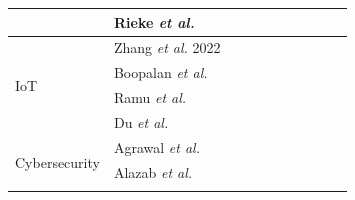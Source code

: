 \documentclass[journal]{IEEEtran}
\newcommand{\cmark}{\ding{51}}
\newcommand{\xmark}{\ding{55}}
\begin{document}
\begin{table}[t]
\begin{tabular}{|l|l|lllll|lll|}
                       &          Rieke \textit{et al.}~\cite{rieke2020future}             & \multicolumn{1}{c|}{\xmark} & \multicolumn{1}{c|}{\cmark} & \multicolumn{1}{c|}{\cmark} & \multicolumn{1}{c|}{\xmark} & \multicolumn{1}{c|}{\cmark} & \multicolumn{1}{c|}{\cmark} & \multicolumn{1}{c|}{\cmark} & \multicolumn{1}{c|}{\cmark} \\ \hline
    \multirow{4}{*}{IoT}  &   Zhang \textit{et al.} 2022~\cite{zhang2022federated}         & \multicolumn{1}{c|}{\cmark} & \multicolumn{1}{c|}{\cmark} & \multicolumn{1}{c|}{\xmark} & \multicolumn{1}{c|}{\xmark} & \multicolumn{1}{c|}{\xmark} & \multicolumn{1}{c|}{\cmark} & \multicolumn{1}{c|}{\cmark} & \multicolumn{1}{c|}{\cmark} \\ \cline{2-10} 
                       &    Boopalan \textit{et al.}~\cite{boopalan2022fusion}    & \multicolumn{1}{c|}{ \cmark } & \multicolumn{1}{c|}{\cmark} & \multicolumn{1}{c|}{\cmark} & \multicolumn{1}{c|}{\cmark} & \multicolumn{1}{c|}{\cmark}  & \multicolumn{1}{c|}{\cmark} & \multicolumn{1}{c|}{\cmark} & \multicolumn{1}{c|}{\cmark}  \\ \cline{2-10}
                       &    Ramu \textit{et al.}~\cite{ramu2022federated}    & \multicolumn{1}{c|}{ \cmark } & \multicolumn{1}{c|}{\cmark} & \multicolumn{1}{c|}{\cmark} & \multicolumn{1}{c|}{\xmark} & \multicolumn{1}{c|}{\cmark}  & \multicolumn{1}{c|}{\cmark} & \multicolumn{1}{c|}{\cmark} & \multicolumn{1}{c|}{\cmark}  \\ \cline{2-10}
                       &  Du \textit{et al.}~\cite{du2020federated} & \multicolumn{1}{c|}{\cmark} & \multicolumn{1}{c|}{\cmark} & \multicolumn{1}{c|}{\cmark} & \multicolumn{1}{c|}{\cmark} & \multicolumn{1}{c|}{\cmark} & \multicolumn{1}{c|}{\cmark} & \multicolumn{1}{c|}{\cmark} & \multicolumn{1}{c|}{\cmark} \\ \hline
    \multirow{3}{*}{Cybersecurity}  &  Agrawal \textit{et al.}~\cite{agrawal2022federated} & \multicolumn{1}{c|}{\cmark} & \multicolumn{1}{c|}{\cmark} & \multicolumn{1}{c|}{\cmark} & \multicolumn{1}{c|}{\xmark} & \multicolumn{1}{c|}{\cmark} & \multicolumn{1}{c|}{\cmark} & \multicolumn{1}{c|}{\cmark} & \multicolumn{1}{c|}{\cmark} \\ \cline{2-10} 
                       &  Alazab \textit{et al.}~\cite{alazab2021federated}  & \multicolumn{1}{c|}{\xmark} & \multicolumn{1}{c|}{\xmark} & \multicolumn{1}{c|}{\cmark} & \multicolumn{1}{c|}{\xmark} & \multicolumn{1}{c|}{\xmark} & \multicolumn{1}{c|}{\cmark} & \multicolumn{1}{c|}{\cmark} & \multicolumn{1}{c|}{\cmark} \\ \cline{2-10} 

\end{tabular}
\end{table}
\end{document}
